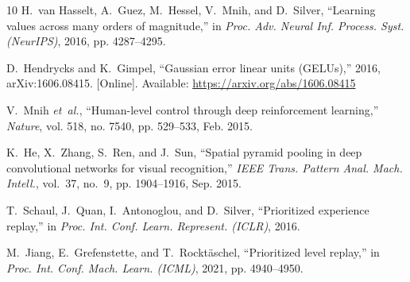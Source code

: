 \documentclass[conference]{IEEEtran}
\begin{document}
\begin{thebibliography}{10}
H.~{van Hasselt}, A.~Guez, M.~Hessel, V.~Mnih, and D.~Silver, ``Learning values
  across many orders of magnitude,'' in \emph{Proc. Adv. Neural Inf. Process.
  Syst. ({NeurIPS})}, 2016, pp. 4287--4295.

\BIBentryALTinterwordspacing
D.~Hendrycks and K.~Gimpel, ``Gaussian error linear units ({GELUs}),'' 2016,
  arXiv:1606.08415. [Online]. Available: \url{https://arxiv.org/abs/1606.08415}
\BIBentrySTDinterwordspacing

V.~Mnih \emph{et~al.}, ``Human-level control through deep reinforcement
  learning,'' \emph{Nature}, vol. 518, no. 7540, pp. 529--533, Feb. 2015.

K.~He, X.~Zhang, S.~Ren, and J.~Sun, ``Spatial pyramid pooling in deep
  convolutional networks for visual recognition,'' \emph{{IEEE} Trans. Pattern
  Anal. Mach. Intell.}, vol.~37, no.~9, pp. 1904--1916, Sep. 2015.

T.~Schaul, J.~Quan, I.~Antonoglou, and D.~Silver, ``Prioritized experience
  replay,'' in \emph{Proc. Int. Conf. Learn. Represent. ({ICLR})}, 2016.

M.~Jiang, E.~Grefenstette, and T.~Rockt{\"a}schel, ``Prioritized level
  replay,'' in \emph{Proc. Int. Conf. Mach. Learn. ({ICML})}, 2021, pp.
  4940--4950.

\end{thebibliography}





\end{document}

